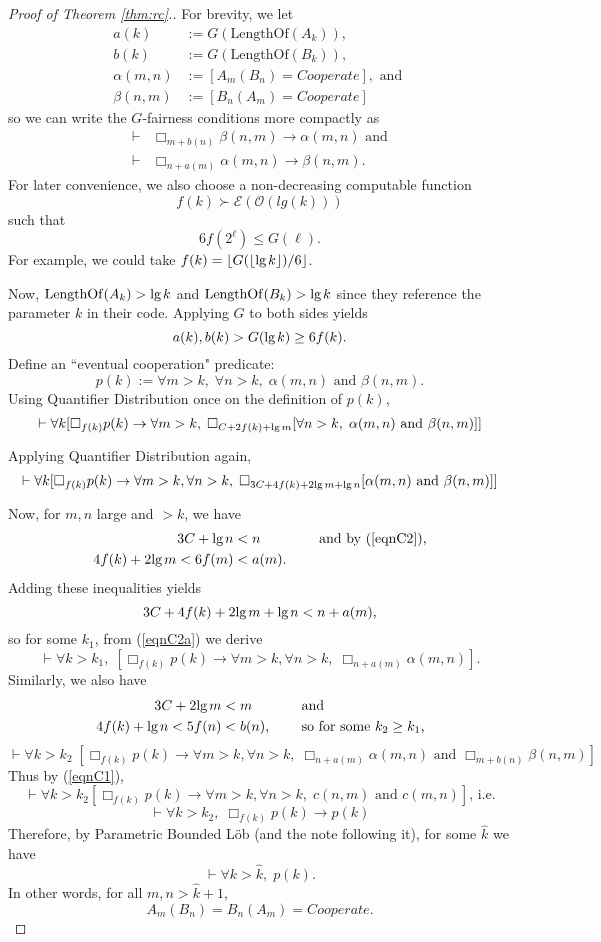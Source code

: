 \documentclass[onecolumn]{miri-tech-article}
\DeclarePairedDelimiter\floor{\lfloor}{\rfloor}
\numberwithin{equation}{section}
\newcommand{\eqn}[1]{\begin{equation}#1\end{equation}}
\theoremstyle{definition}
\newcommand{\Ee}{\mathcal{E}}
\newcommand{\Oo}{\mathcal{O}}
\newcommand{\proves}[1]{\underset{#1}{\vdash}}
\newcommand{\bx}[1]{\Box_{#1}}
\renewcommand{\implies}{\rightarrow}
\newcommand{\AND}{{\textrm{ and }}}
\renewcommand{\lg}{\mathrm{lg\hspace{0.3ex}}}
\renewcommand{\-}{^{-1}}
\begin{document}
\begin{proof}[Proof of Theorem \ref{thm:rc}.]
For brevity, we let
\begin{align}
a(k) &:= G(\mathrm{LengthOf}(A_k)), \\
b(k) &:= G(\mathrm{LengthOf}(B_k)), \\
\alpha(m,n) &:= [A_m(B_n) = Cooperate], \text{ and }\\
\beta(n,m) &:= [B_n(A_m) = Cooperate]
\end{align}
so we can write the $G$-fairness conditions more compactly as
\begin{align}
\label{eqnC1}     \proves{} &\bx{m+b(n)} \beta(n,m) \implies \alpha(m,n) \text{ and}\\
\nonumber    \proves{} &\bx{n+a(m)} \alpha(m,n) \implies \beta(n,m).
\end{align}
%
\noindent For later convenience, we also choose a non-decreasing computable function 
$$f(k) \succ \Ee(\Oo(lg(k)))$$ 
such that 
$$6f(2^\ell) \leq G(\ell).$$
For example, we could take $f(k) = \floor{G(\floor{\lg k})/6}$. 

Now, $\mathrm{LengthOf}(A_k) > \lg k$ and $\mathrm{LengthOf}(B_k) > \lg k$ since they reference the parameter $k$ in their code.  Applying $G$ to both sides yields
\eqn{\label{eqnC2} a(k),b(k) > G(\lg k) \geq 6f(k).}
Define an ``eventual cooperation" predicate:
$$p(k) := \forall m> k,\; \forall n> k, \; \alpha(m,n) \AND \beta(n,m).$$
Using Quantifier Distribution once on the definition of $p(k)$,
$$\proves{} \forall k [\bx{f(k)}p(k) \implies \forall m>k, \; \bx{C+2f(k)+\lg m } [\forall n > k, \; \alpha(m,n) \AND \beta(n,m)]]$$
Applying Quantifier Distribution again,
\eqn{\label{eqnC2a}\proves{} \forall k [\bx{f(k)}p(k) \implies \forall m>k, \forall n > k, \;  \bx{3C+4f(k)+2\lg m +\lg n }[\alpha(m,n) \AND \beta(n,m)]]}
Now, for $m,n$ large and $>k$, we have
\begin{align*}
3C + \lg n  &< n &&\textrm{ \quad and by (\ref{eqnC2}),}\\
4f(k) + 2\lg m  < 6f(m) &< a(m). &&
\end{align*}
Adding these inequalities yields
$$3C+4f(k)+2\lg m +\lg n < n+a(m),$$
so for some $k_1$, from (\ref{eqnC2a}) we derive
$$\proves{} \forall k>k_1,\; [\bx{f(k)}p(k) \implies \forall m>k, \forall n > k, \;  \bx{n+a(m)}\alpha(m,n)].$$
Similarly, we also have
\begin{align*}
3C + 2\lg m  &< m &&\textrm{ \quad and }\\
4f(k) + \lg n  < 5f(n) &< b(n), &&\text{ \quad so for some $k_2\geq k_1$,}
\end{align*}
$$\proves{} \forall k>k_2 \; [\bx{f(k)}p(k) \implies \forall m>k, \forall n > k, \;  \bx{n+a(m)}\alpha(m,n) \AND \bx{m+b(n)}\beta(n,m)]$$
Thus by (\ref{eqnC1}),
$$\proves{} \forall k > k_2 [\bx{f(k)}p(k) \implies \forall m>k, \forall n > k, \;  c(n,m) \AND c(m,n)]\text{, i.e.}$$
$$\proves{} \forall k > k_2, \; \bx{f(k)}p(k) \implies p(k)$$
Therefore, by Parametric Bounded L\"{o}b (and the note following it), for some $\hat k$ we have
$$\proves{} \forall k > \hat k, \; p(k).$$
In other words, for all $m,n>\hat k + 1$, 
$$A_m(B_n)=B_n(A_m)=Cooperate.$$
\end{proof}
\end{document}
